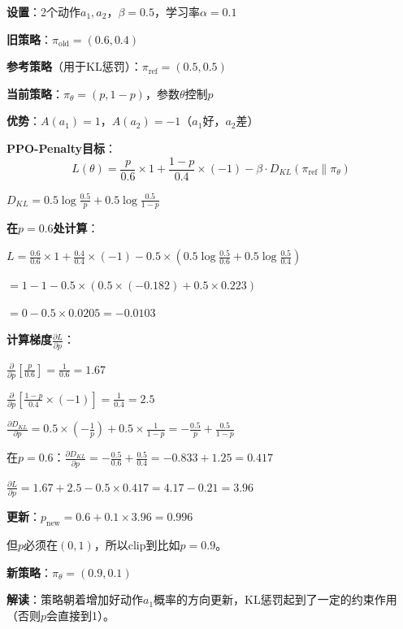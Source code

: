 \documentclass[11pt,a4paper]{article}
\theoremstyle{definition}
\begin{document}
\begin{calculation}
\textbf{设置}：2个动作$a_1, a_2$，$\beta = 0.5$，学习率$\alpha = 0.1$

\textbf{旧策略}：$\pi_{\text{old}} = (0.6, 0.4)$

\textbf{参考策略}（用于KL惩罚）：$\pi_{\text{ref}} = (0.5, 0.5)$

\textbf{当前策略}：$\pi_\theta = (p, 1-p)$，参数$\theta$控制$p$

\textbf{优势}：$A(a_1) = 1$，$A(a_2) = -1$（$a_1$好，$a_2$差）

\textbf{PPO-Penalty目标}：
\[
L(\theta) = \frac{p}{0.6} \times 1 + \frac{1-p}{0.4} \times (-1) - \beta \cdot D_{KL}(\pi_{\text{ref}} \| \pi_\theta)
\]

$D_{KL} = 0.5 \log \frac{0.5}{p} + 0.5 \log \frac{0.5}{1-p}$

\textbf{在$p = 0.6$处计算}：

$L = \frac{0.6}{0.6} \times 1 + \frac{0.4}{0.4} \times (-1) - 0.5 \times (0.5 \log \frac{0.5}{0.6} + 0.5 \log \frac{0.5}{0.4})$

$= 1 - 1 - 0.5 \times (0.5 \times (-0.182) + 0.5 \times 0.223)$

$= 0 - 0.5 \times 0.0205 = -0.0103$

\textbf{计算梯度}$\frac{\partial L}{\partial p}$：

$\frac{\partial}{\partial p}\left[\frac{p}{0.6}\right] = \frac{1}{0.6} = 1.67$

$\frac{\partial}{\partial p}\left[\frac{1-p}{0.4} \times (-1)\right] = \frac{1}{0.4} = 2.5$

$\frac{\partial D_{KL}}{\partial p} = 0.5 \times \left(-\frac{1}{p}\right) + 0.5 \times \frac{1}{1-p} = -\frac{0.5}{p} + \frac{0.5}{1-p}$

在$p = 0.6$：$\frac{\partial D_{KL}}{\partial p} = -\frac{0.5}{0.6} + \frac{0.5}{0.4} = -0.833 + 1.25 = 0.417$

$\frac{\partial L}{\partial p} = 1.67 + 2.5 - 0.5 \times 0.417 = 4.17 - 0.21 = 3.96$

\textbf{更新}：$p_{\text{new}} = 0.6 + 0.1 \times 3.96 = 0.996$

但$p$必须在$(0,1)$，所以clip到比如$p = 0.9$。

\textbf{新策略}：$\pi_\theta = (0.9, 0.1)$

\textbf{解读}：策略朝着增加好动作$a_1$概率的方向更新，KL惩罚起到了一定的约束作用（否则$p$会直接到1）。
\end{calculation}
\end{document}

